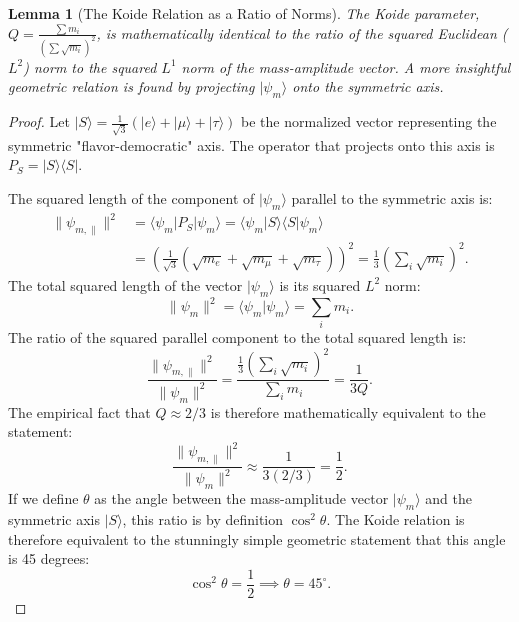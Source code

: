 \documentclass[11pt, letterpaper]{report}
\theoremstyle{plain} %
\newtheorem{lemma}[theorem]{Lemma}
\theoremstyle{definition} %
\theoremstyle{remark} %
\begin{document}
\begin{lemma}[The Koide Relation as a Ratio of Norms]
The Koide parameter, $Q = \frac{\sum m_i}{(\sum \sqrt{m_i})^2}$, is mathematically identical to the ratio of the squared Euclidean ($L^2$) norm to the squared $L^1$ norm of the mass-amplitude vector. A more insightful geometric relation is found by projecting $|\psi_m\rangle$ onto the symmetric axis.
\end{lemma}
\begin{proof}
Let $|S\rangle = \frac{1}{\sqrt{3}}(|e\rangle + |\mu\rangle + |\tau\rangle)$ be the normalized vector representing the symmetric "flavor-democratic" axis. The operator that projects onto this axis is $P_S = |S\rangle\langle S|$.

The squared length of the component of $|\psi_m\rangle$ parallel to the symmetric axis is:
\begin{align}
    \|\psi_{m, \parallel}\|^2 &= \langle\psi_m|P_S|\psi_m\rangle = \langle\psi_m|S\rangle\langle S|\psi_m\rangle \\
    &= \left( \frac{1}{\sqrt{3}}(\sqrt{m_e}+\sqrt{m_\mu}+\sqrt{m_\tau}) \right)^2 = \frac{1}{3}\left(\sum_i \sqrt{m_i}\right)^2.
\end{align}
The total squared length of the vector $|\psi_m\rangle$ is its squared $L^2$ norm:
\begin{equation}
    \|\psi_m\|^2 = \langle\psi_m|\psi_m\rangle = \sum_i m_i.
\end{equation}
The ratio of the squared parallel component to the total squared length is:
\begin{equation}
    \frac{\|\psi_{m, \parallel}\|^2}{\|\psi_m\|^2} = \frac{\frac{1}{3}\left(\sum_i \sqrt{m_i}\right)^2}{\sum_i m_i} = \frac{1}{3Q}.
\end{equation}
The empirical fact that $Q \approx 2/3$ is therefore mathematically equivalent to the statement:
\begin{equation}
    \frac{\|\psi_{m, \parallel}\|^2}{\|\psi_m\|^2} \approx \frac{1}{3(2/3)} = \frac{1}{2}.
\end{equation}
If we define $\theta$ as the angle between the mass-amplitude vector $|\psi_m\rangle$ and the symmetric axis $|S\rangle$, this ratio is by definition $\cos^2\theta$. The Koide relation is therefore equivalent to the stunningly simple geometric statement that this angle is 45 degrees:
\begin{equation}
    \cos^2\theta = \frac{1}{2} \implies \theta = 45^\circ.
    \label{eq:koide_angle}
\end{equation}
\end{proof}
\end{document}

